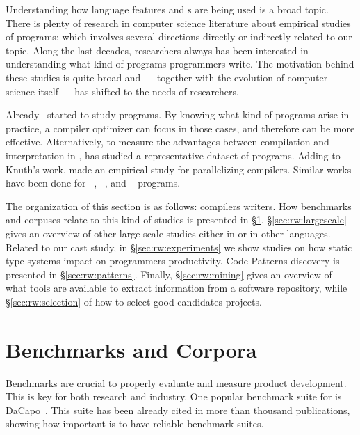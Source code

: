 Understanding how language features and \api{}s are being used is a
broad topic.
There is plenty of research in computer science literature about
empirical studies of programs; which involves several directions directly or indirectly related to our topic.
Along the last decades, researchers always has been interested in
understanding what kind of programs programmers write.
The motivation behind these studies is quite broad and ---
together with the evolution of computer science itself ---
has shifted to the needs of researchers.

Already~\cite{knuth_empirical_1971} started to study \fortran{} programs.
By knowing what kind of programs arise in practice, a compiler optimizer can focus in those cases, and therefore can be more effective.
Alternatively, to measure the advantages between compilation and interpretation in \basic{}, \cite{hammond_basic_1977} has studied a representative dataset of programs.
Adding to Knuth's work, \cite{shen_empirical_1990} made an empirical study for parallelizing compilers.
Similar works have been done for \cobol{}~\cite{salvadori_static_1975,chevance_static_1978}, \pascal{}~\cite{cook_contextual_1982}, and \apl{}~\cite{saal_properties_1975,saal_empirical_1977} programs. 

The organization of this section is as follows: 
compilers writers. 
How benchmarks and corpuses relate to this kind of studies is
presented in \S\ref{sec:rw:benchmarks}. 
\S\ref{sec:rw:largescale} gives an overview of other large-scale studies either in \java{} or in other languages. 
Related to our cast study, in \S\ref{sec:rw:experiments} we show studies on how static type systems impact on programmers productivity. 
Code Patterns discovery is presented in \S\ref{sec:rw:patterns}. 
Finally, \S\ref{sec:rw:mining} gives an overview of what tools are available to extract information from a software repository,
while \S\ref{sec:rw:selection} of how to select good candidates projects. 

\section{Benchmarks and Corpora}
\label{sec:rw:benchmarks}

Benchmarks are crucial to properly evaluate and measure product development.
This is key for both research and industry.
One popular benchmark suite for \java{} is DaCapo~\cite{blackburn_dacapo_2006}.
This suite has been already cited in more than thousand publications, showing how important is to have reliable benchmark suites.

